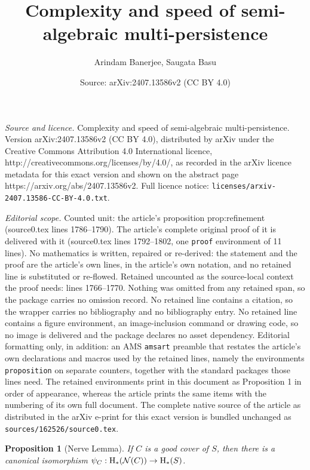 \documentclass[10pt,a4paper]{amsart}
\title{Complexity and speed of semi-algebraic multi-persistence}
\author{Arindam Banerjee, Saugata Basu}
\date{Source: arXiv:2407.13586v2 (CC BY 4.0)}
\newtheorem{proposition}{Proposition}
\newcommand{\HH}  {\mbox{\rm H}}
\newcommand{\Nerve}{\mathcal{N}}
\begin{document}
\maketitle

\noindent\emph{Source and licence.} Complexity and speed of semi-algebraic multi-persistence. Version arXiv:2407.13586v2 (CC BY 4.0), distributed by arXiv under the Creative Commons Attribution 4.0 International licence, http://creativecommons.org/licenses/by/4.0/, as recorded in the arXiv licence metadata for this exact version and shown on the abstract page https://arxiv.org/abs/2407.13586v2. Full licence notice: \texttt{licenses/arxiv-2407.13586-CC-BY-4.0.txt}.\par\smallskip

\noindent\textit{Editorial scope.} Counted unit: the article's proposition prop:refinement (source0.tex lines 1786--1790). The article's complete original proof of it is delivered with it (source0.tex lines 1792--1802, one \texttt{proof} environment of 11 lines). No mathematics is written, repaired or re-derived: the statement and the proof are the article's own lines, in the article's own notation, and no retained line is substituted or re-flowed.  Retained uncounted as the source-local context the proof needs: lines 1766--1770.  Nothing was omitted from any retained span, so the package carries no omission record.  No retained line contains a citation, so the wrapper carries no bibliography and no bibliography entry.  No retained line contains a figure environment, an image-inclusion command or drawing code, so no image is delivered and the package declares no asset dependency.  Editorial formatting only, in addition: an AMS \texttt{amsart} preamble that restates the article's own declarations and macros used by the retained lines, namely the environments \texttt{proposition} on separate counters, together with the standard packages those lines need.  The retained environments print in this document as Proposition 1 in order of appearance, whereas the article prints the same items with the numbering of its own full document.  The complete native source of the article as distributed in the arXiv e-print for this exact version is bundled unchanged as \texttt{sources/162526/source0.tex}.
\begin{proposition}[Nerve Lemma]
\label{prop:nerve}
    If $C$ is a good cover of $S$, then there is a  canonical isomorphism
    $\psi_C: \HH_*(\Nerve(C)) \rightarrow \HH_*(S)$.
\end{proposition}
\end{document}
